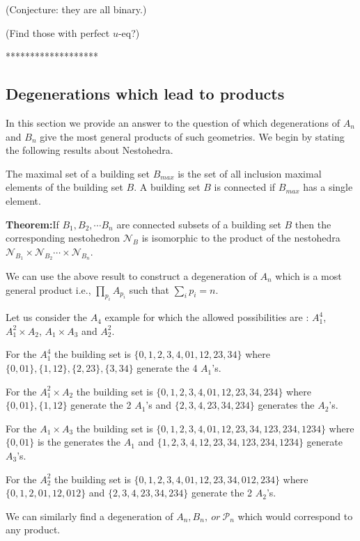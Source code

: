 \documentclass[hidelinks,12pt]{article}
\begin{document}
(Conjecture: they are all binary.)

(Find those with perfect $u$-eq?)

*******************
\subsection*{Degenerations which lead to products}
In this section we provide an answer to the question of which degenerations of $A_n$ and $B_n$ give the most general products of such geometries. We begin by stating the following results about Nestohedra.

The maximal set of a building set $B_{max}$ is the set of all inclusion maximal elements of the building set $B$. A building set $B$ is connected if $B_{max}$ has a single element.

{\bf Theorem:}If $B_1, B_2,\cdots B_n$ are connected subsets of a building set $B$ then the corresponding nestohedron ${\mathscr N_B}$ is isomorphic to the product of the nestohedra ${\mathscr N}_{ B_1} \times{\mathscr N}_{ B_2} \cdots \times {\mathscr N}_{B_n}$.

We can use the above result to construct 	a degeneration of $A_n$ which is a most general product i.e., $\prod_{p_i} A_{p_i}$ such that $\sum_{i} p_{i} = n$. 

Let us consider the  $A_4$ example for which the allowed possibilities are : $A_1^{4}$, $A_1^2 \times A_2$, $A_1 \times A_3$ and $A^{2}_2$.
 
For the $A_1^{4}$ the building set is $ \{ {0},{1},{2},{3},{4},{01},{12},{23},{34} \}$ where $\{0,01\} , \{1,12\},\{2,23\},\{3,34\}$ generate the 4 $A_1$'s.

For the $A_1^{2} \times A_2$ the building set is $ \{ {0},{1},{2},{3},{4},{01},{12},{23},{34},{234} \}$ where $\{0,01\} , \{1,12\} $ generate the 2 $A_1$'s and $\{2,3,4,23,34,234\}$ generates the $A_2$'s.

For the $A_1 \times A_3$ the building set is $ \{ {0},{1},{2},{3},{4},{01},{12},{23},{34},{123},{234},{1234} \}$ where $\{0,01\}$ is the generates the $A_1$ and $\{{1},{2},{3},{4},{12},{23},{34},{123},{234},{1234} \}$ generate  $A_3$'s.

For the $A_2^{2}$ the building set is $ \{ {0},{1},{2},{3},{4},{01},{12},{23},{34} ,{012},{234}\}$ where $\{0,1,2,01,12,012\}$  and $\{2,3,4,23,34,234\}$ generate the 2 $A_2$'s.

We can similarly find a degeneration of $A_n,B_n,~or~ {\mathscr P_n}$ which would correspond to any product.
\end{document}
